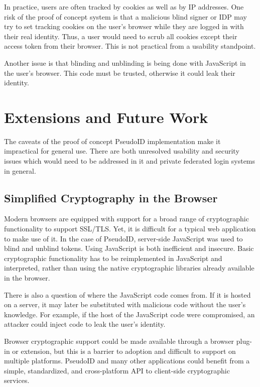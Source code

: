 \documentclass{llncs}
\begin{document}
In practice, users are often tracked by cookies as well as by IP
addresses. One risk of the proof of concept system is that a malicious
blind signer or IDP may try to set tracking cookies on the user's
browser while they are logged in with their real identity. Thus, a
user would need to scrub all cookies except their access token from
their browser. This is not practical from a usability standpoint.

Another issue is that blinding and unblinding is being done with
JavaScript in the user's browser. This code must be trusted, otherwise
it could leak their identity. 

\section{Extensions and Future Work}

The caveats of the proof of concept PseudoID implementation make it
impractical for general use. There are both unresolved usability and
security issues which would need to be addressed in it and private
federated login systems in general.

\subsection{Simplified Cryptography in the Browser}

Modern browsers are equipped with support for a broad range of
cryptographic functionality to support SSL/TLS. Yet, it is difficult
for a typical web application to make use of it. In the case of
PseudoID, server-side JavaScript was used to blind and unblind
tokens. Using JavaScript is both inefficient and insecure. Basic
cryptographic functionality has to be reimplemented in JavaScript and
interpreted, rather than using the native cryptographic libraries
already available in the browser.

There is also a question of where the JavaScript code comes from. If
it is hosted on a server, it may later be substituted with malicious
code without the user's knowledge. For example, if the host of the
JavaScript code were compromised, an attacker could inject code to
leak the user's identity.

Browser cryptographic support could be made available through
a browser plug-in or extension, but this is a barrier to adoption and
difficult to support on multiple platforms. PseudoID and many other
applications could benefit from a simple, standardized, and
cross-platform API to client-side cryptographic services.
\end{document}
